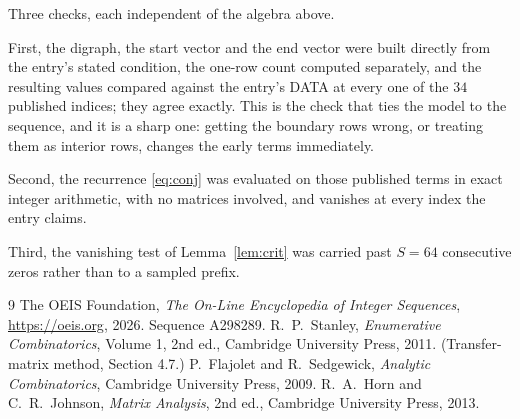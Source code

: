 \documentclass[11pt,a4paper]{article}
\theoremstyle{plain}
\theoremstyle{definition}
\begin{document}
Three checks, each independent of the algebra above.

First, the digraph, the start vector and the end vector were built directly from the
entry's stated condition, the one-row count computed separately, and the resulting values
compared against the entry's DATA at every one of the $34$ published indices; they
agree exactly. This is the check that ties the model to the sequence, and it is a sharp one:
getting the boundary rows wrong, or treating them as interior rows, changes the early terms
immediately.

Second, the recurrence \eqref{eq:conj} was evaluated on those published terms in exact
integer arithmetic, with no matrices involved, and vanishes at every index the entry claims.

Third, the vanishing test of Lemma~\ref{lem:crit} was carried past $S=64$ consecutive
zeros rather than to a sampled prefix.

\begin{thebibliography}{9}
 The OEIS Foundation, \emph{The On-Line Encyclopedia of Integer
Sequences}, \url{https://oeis.org}, 2026. Sequence A298289.
 R.~P.~Stanley, \emph{Enumerative Combinatorics}, Volume 1, 2nd ed.,
Cambridge University Press, 2011. (Transfer-matrix method, Section 4.7.)
 P.~Flajolet and R.~Sedgewick, \emph{Analytic Combinatorics}, Cambridge
University Press, 2009.
 R.~A.~Horn and C.~R.~Johnson, \emph{Matrix Analysis}, 2nd ed., Cambridge
University Press, 2013.
\end{thebibliography}
\end{document}
